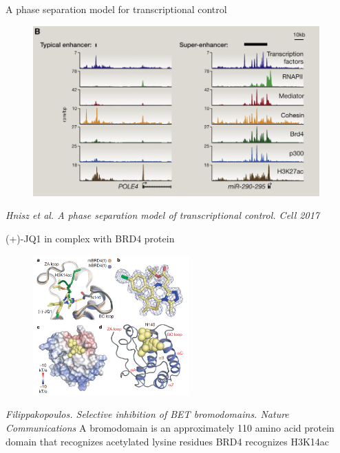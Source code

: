 \documentclass{beamer}					%
\begin{document}
\begin{frame}{A phase separation model for transcriptional control}
\begin{figure}
\includegraphics[width=11cm]{Super2.png}
\end{figure}
\textit{Hnisz et al. A phase separation model of transcriptional control. Cell 2017}
\end{frame}

\begin{frame}{(+)-JQ1 in complex with BRD4 protein}
\begin{figure}
\includegraphics[width=6cm]{JQ1.png}
\end{figure}
\textit{Filippakopoulos. Selective inhibition of BET bromodomains. Nature Communications}
A bromodomain is an approximately 110 amino acid protein domain that recognizes acetylated lysine residues
BRD4 recognizes H3K14ac
\end{frame}
\end{document}
